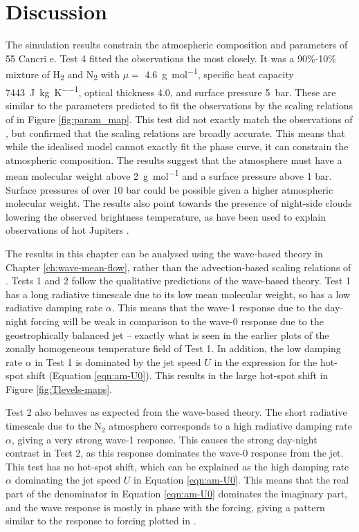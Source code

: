 \section{Discussion}\label{sec:discussion}

The simulation results constrain the atmospheric composition and parameters of 55 Cancri e. Test 4 fitted the observations the most closely. It was a 90\%-10\% mixture of H\textsubscript{2} and N\textsubscript{2} with $\mu =$ \SI{4.6}{\gram\per\mole}, specific heat capacity \SI{7443}{\joule\per\kilogram\per\kelvin}, optical thickness 4.0, and surface pressure \SI{5}{\bar}. These are similar to the parameters predicted to fit the observations by the scaling relations of \citet{zhang2017dynamics} in Figure \ref{fig:param_map}. This test did not exactly match the observations of \citet{demory201655cnce}, but confirmed that the scaling relations are broadly accurate. This means that while the idealised model cannot exactly fit the phase curve, it can constrain the atmospheric composition. The results suggest that the atmosphere must have a mean molecular weight above \SI{2}{\gram\per\mole} and a surface pressure above 1 bar. Surface pressures of over 10 bar could be possible given a higher atmospheric molecular weight. The results also point towards the presence of night-side clouds lowering the observed brightness temperature, as have been used to explain observations of hot Jupiters \citep{parmentier2016transitions}.

The results in this chapter can be analysed using the wave-based theory in Chapter \ref{ch:wave-mean-flow}, rather than the advection-based scaling relations of \citet{zhang2017dynamics}. Tests 1 and 2 follow the qualitative predictions of the wave-based theory. Test 1 has a long radiative timescale due to its low mean molecular weight, so has a low radiative damping rate $\alpha$. This means that the wave-1 response due to the day-night forcing will be weak in comparison to the wave-0 response due to the geostrophically balanced jet -- exactly what is seen in the earlier plots of the zonally homogeneous temperature field of Test 1. In addition, the low damping rate $\alpha$ in Test 1 is dominated by the jet speed $U$ in the expression for the hot-spot shift (Equation \ref{eqn:am-U0}). This results in the large hot-spot shift in Figure \ref{fig:Tlevels-maps}.

Test 2 also behaves as expected from the wave-based theory. The short radiative timescale due to the N$_{2}$ atmosphere corresponds to a high radiative damping rate $\alpha$, giving a very strong wave-1 response. This causes the strong day-night contrast in Test 2, as this response dominates the wave-0 response from the jet. This test has no hot-spot shift, which can be explained as the high damping rate $\alpha$ dominating the jet speed $U$ in Equation \ref{eqn:am-U0}. This means that the real part of the denominator in Equation \ref{eqn:am-U0} dominates the imaginary part, and the wave response is mostly in phase with the forcing, giving a pattern similar to the response to forcing plotted in \citet{matsuno1966quasi}.

